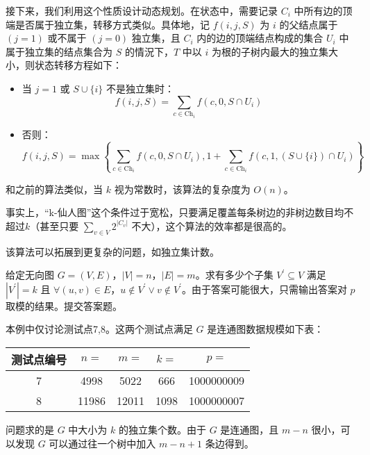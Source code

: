 \documentclass[lang=cn,11pt,a4paper]{elegantpaper}
\begin{document}
接下来，我们利用这个性质设计动态规划。在状态中，需要记录 $C_i$ 中所有边的顶端是否属于独立集，转移方式类似。具体地，记 $f(i, j, S)$ 为 $i$ 的父结点属于 $(j = 1)$ 或不属于 $(j = 0)$ 独立集，且 $C_i$ 内的边的顶端结点构成的集合 $U_i$ 中属于独立集的结点集合为 $S$ 的情況下，$T$ 中以 $i$ 为根的子树内最大的独立集大小，则状态转移方程如下：
\begin{itemize}
    \item 当 $j = 1$ 或 $S \cup \{i\}$ 不是独立集时：
    \[f(i, j, S)=\sum_{c \in \mathrm{Ch}_{i}} f\left(c, 0, S \cap U_{i}\right)\]
    \item 否则：
    \[f(i, j, S)=\max \left\{\sum_{c \in \mathrm{Ch}_{i}} f\left(c, 0, S \cap U_{i}\right), 1+\sum_{c \in \mathrm{Ch}_{i}} f\left(c, 1,(S \cup\{i\}) \cap U_{i}\right)\right\}\]
\end{itemize}

和之前的算法类似，当 $k$ 视为常数时，该算法的复杂度为 $O(n)$。

事实上，“k-仙人图”这个条件过于宽松，只要满足覆盖每条树边的非树边数目均不超过$k$（甚至只要 $\sum_{v \in V}2^{|C_v|}$ 不大），这个算法的效率都是很高的。

该算法可以拓展到更复杂的问题，如独立集计数。

\begin{example}[子集计数问题测试点7,8]
    给定无向图 $G=(V, E)$，$|V| = n$，$|E| = m$。求有多少个子集 $V^{'} \subseteq V$ 满足 $|V^{'}| = k$ 且 $\forall (u, v) \in E$，$u \notin V^{'} \vee v \notin V^{'}$。由于答案可能很大，只需输出答案对 $p$ 取模的结果。提交答案题。
\end{example}

本例中仅讨论测试点7,8。这两个测试点满足 $G$ 是连通图数据规模如下表：

\begin{center}
    \begin{table}[!h]
        \centering
        \begin{tabular}{c|c|c|c|c}
            \hline 
            测试点编号 & $n = $ & $m = $ & $k = $ & $p = $\\
            \hline
            7 & 4998 & 5022 & 666 & 1000000009\\
            \hline
            8 & 11986 & 12011 & 1098 & 1000000007\\
            \hline
        \end{tabular}            
    \end{table}
\end{center}

问题求的是 $G$ 中大小为 $k$ 的独立集个数。由于 $G$ 是连通图，且 $m - n$ 很小，可以发现 $G$ 可以通过往一个树中加入 $m - n + 1$ 条边得到。
\end{document}
